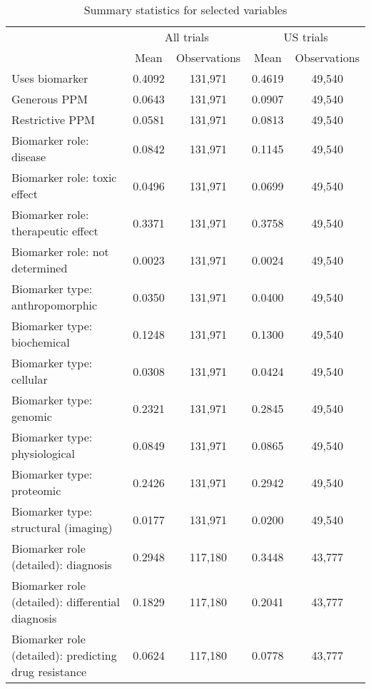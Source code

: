 \begin{table}[htbp]\centering
\def\sym#1{\ifmmode^{#1}\else\(^{#1}\)\fi}
\caption{Summary statistics for selected variables}
\begin{tabular}{l*{2}{cc}}
\hline\hline
                    &\multicolumn{2}{c}{All trials}&\multicolumn{2}{c}{US trials}\\
                    &        Mean&Observations&        Mean&Observations\\
\hline
Uses biomarker      &      0.4092&     131,971&      0.4619&      49,540\\
Generous PPM        &      0.0643&     131,971&      0.0907&      49,540\\
Restrictive PPM     &      0.0581&     131,971&      0.0813&      49,540\\
Biomarker role: disease&      0.0842&     131,971&      0.1145&      49,540\\
Biomarker role: toxic effect&      0.0496&     131,971&      0.0699&      49,540\\
Biomarker role: therapeutic effect&      0.3371&     131,971&      0.3758&      49,540\\
Biomarker role: not determined&      0.0023&     131,971&      0.0024&      49,540\\
Biomarker type: anthropomorphic&      0.0350&     131,971&      0.0400&      49,540\\
Biomarker type: biochemical&      0.1248&     131,971&      0.1300&      49,540\\
Biomarker type: cellular&      0.0308&     131,971&      0.0424&      49,540\\
Biomarker type: genomic&      0.2321&     131,971&      0.2845&      49,540\\
Biomarker type: physiological&      0.0849&     131,971&      0.0865&      49,540\\
Biomarker type: proteomic&      0.2426&     131,971&      0.2942&      49,540\\
Biomarker type: structural (imaging)&      0.0177&     131,971&      0.0200&      49,540\\
Biomarker role (detailed): diagnosis&      0.2948&     117,180&      0.3448&      43,777\\
Biomarker role (detailed): differential diagnosis&      0.1829&     117,180&      0.2041&      43,777\\
Biomarker role (detailed): predicting drug resistance&      0.0624&     117,180&      0.0778&      43,777\\

\end{tabular}
\end{table}
